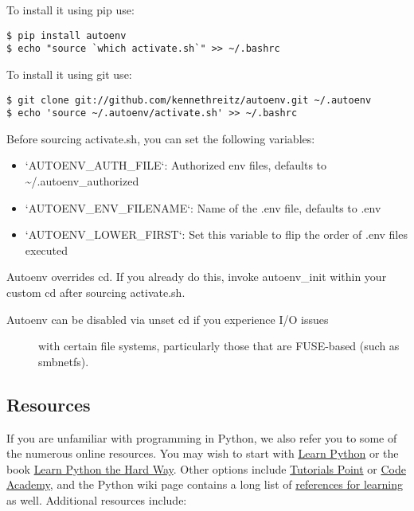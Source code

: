 To install it using pip use:

\begin{verbatim}
$ pip install autoenv
$ echo "source `which activate.sh`" >> ~/.bashrc
\end{verbatim}

To install it using git use:

\begin{verbatim}
$ git clone git://github.com/kennethreitz/autoenv.git ~/.autoenv
$ echo 'source ~/.autoenv/activate.sh' >> ~/.bashrc
\end{verbatim}

Before sourcing activate.sh, you can set the following variables:

\begin{itemize}
\tightlist
\item
  `AUTOENV\_AUTH\_FILE`: Authorized env files, defaults to
  \textasciitilde{}/.autoenv\_authorized
\item
  `AUTOENV\_ENV\_FILENAME`: Name of the .env file, defaults to .env
\item
  `AUTOENV\_LOWER\_FIRST`: Set this variable to flip the order of .env
  files executed
\end{itemize}

Autoenv overrides cd. If you already do this, invoke autoenv\_init
within your custom cd after sourcing activate.sh.

\begin{description}
\item[Autoenv can be disabled via unset cd if you experience I/O issues]
with certain file systems, particularly those that are FUSE-based (such
as smbnetfs).
\end{description}

\subsection{Resources}\label{resources}

If you are unfamiliar with programming in Python, we also refer you to
some of the numerous online resources. You may wish to start with
\href{https://www.learnpython.org}{Learn Python} or the book
\href{http://learnpythonthehardway.org/book/}{Learn Python the Hard
Way}. Other options include
\href{http://www.tutorialspoint.com/python/}{Tutorials Point} or
\href{http://www.codecademy.com/en/tracks/python}{Code Academy}, and the
Python wiki page contains a long list of
\href{https://wiki.python.org/moin/BeginnersGuide/Programmers}{references
for learning} as well. Additional resources include:

